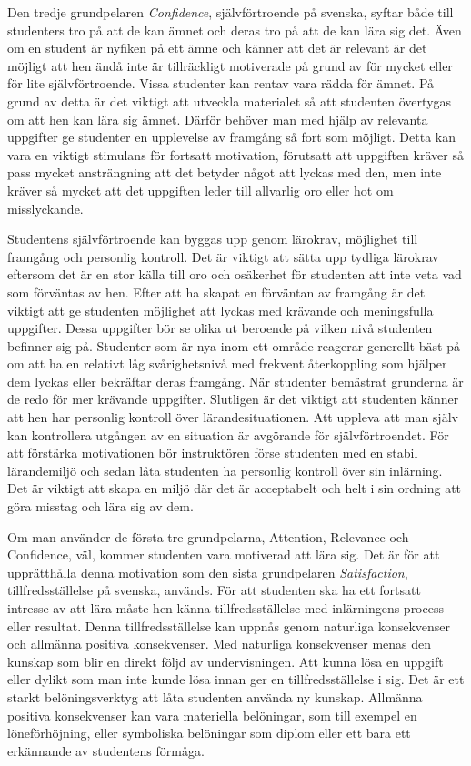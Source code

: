 \documentclass[12pt,a4paper,twoside,openright]{article}
\begin{document}
Den tredje grundpelaren \textit{Confidence}, självförtroende på
svenska, syftar både till studenters tro på att de kan ämnet och deras
tro på att de kan lära sig det. Även om en student är nyfiken på ett
ämne och känner att det är relevant är det möjligt att hen ändå inte
är tillräckligt motiverade på grund av för mycket eller för lite
självförtroende. Vissa studenter kan rentav vara rädda för ämnet. På
grund av detta är det viktigt att utveckla materialet så att studenten
övertygas om att hen kan lära sig ämnet. Därför behöver man med hjälp
av relevanta uppgifter ge studenter en upplevelse av framgång så fort
som möjligt. Detta kan vara en viktigt stimulans för fortsatt
motivation, förutsatt att uppgiften kräver så pass mycket ansträngning
att det betyder något att lyckas med den, men inte kräver så mycket
att det uppgiften leder till allvarlig oro eller hot om misslyckande.

Studentens självförtroende kan byggas upp genom lärokrav, möjlighet
till fram\-gång och personlig kontroll. Det är viktigt att sätta upp
tydliga lärokrav eftersom det är en stor källa till oro och osäkerhet
för studenten att inte veta vad som förväntas av hen. Efter att ha
skapat en förväntan av framgång är det viktigt att ge studenten
möjlighet att lyckas med krävande och meningsfulla uppgifter. Dessa
uppgifter bör se olika ut beroende på vilken nivå studenten befinner
sig på. Studenter som är nya inom ett område reagerar generellt bäst
på om att ha en relativt låg svårighetsnivå med frekvent återkoppling
som hjälper dem lyckas eller bekräftar deras framgång. När studenter
bemästrat grunderna är de redo för mer krävande uppgifter.
Slutligen är det viktigt att studenten känner att hen har personlig
kontroll över lärandesituationen. Att uppleva att man själv kan
kontrollera utgången av en situation är avgörande för självförtroendet.
För att förstärka motivationen bör instruktören förse studenten med en
stabil lärandemiljö och sedan låta studenten ha personlig kontroll över sin
inlärning. Det är viktigt att skapa en miljö där det är acceptabelt och helt
i sin ordning att göra misstag och lära sig av dem.

Om man använder de första tre grundpelarna, Attention, Relevance och
Confidence, väl, kommer studenten vara motiverad att lära sig. Det är
för att upprätthålla denna motivation som den sista grundpelaren
\textit{Satisfaction}, tillfredsställelse på svenska, används. För
att studenten ska ha ett fortsatt intresse av att lära måste hen känna
tillfredsställelse med inlärningens process eller resultat. Denna
tillfredsställelse kan uppnås genom naturliga konsekvenser och
allmänna positiva konsekvenser. Med naturliga konsekvenser menas den
kunskap som blir en direkt följd av undervisningen. Att kunna lösa en
uppgift eller dylikt som man inte kunde lösa innan ger en
tillfredsställelse i sig. Det är ett starkt belöningsverktyg att låta
studenten använda ny kunskap. Allmänna positiva konsekvenser kan vara
materiella belöningar, som till exempel en löneförhöjning, eller
symboliska belöningar som diplom eller ett bara ett erkännande av
studentens förmåga.
\end{document}
